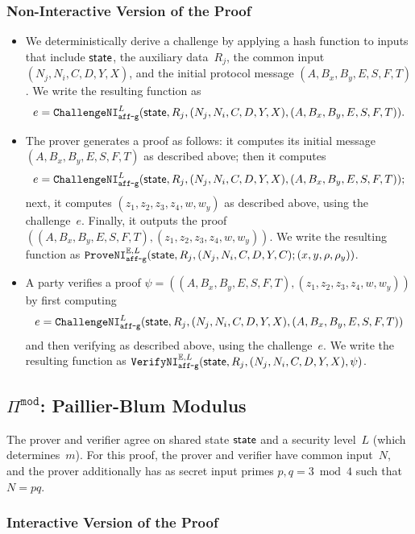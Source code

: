 \documentclass[11pt]{article}
\def\state{{\sf state}}
\newcommand{\proof}[1]{\ensuremath{\Pi^{\mathtt{#1}}}}
\newcommand{\challengeni}[1]{\ensuremath{\mathtt{ChallengeNI}_{\mathtt{#1}}}}
\newcommand{\proveni}[1]{\ensuremath{\mathtt{ProveNI}_{\mathtt{#1}}}}
\newcommand{\verifyni}[1]{\ensuremath{\mathtt{VerifyNI}_{\mathtt{#1}}}}
\newcommand{\E}{\mathbb{E}}
\newcommand{\?}[1]{\stackrel{?}{#1}}
\begin{document}
\subsubsection{Non-Interactive Version of the Proof}
\begin{itemize}
    \item We deterministically derive a challenge by applying a hash function to inputs that include $\state$, the auxiliary data~$R_j$, the common input~$(N_j,N_i,C,D,Y,X)$, and the initial protocol message $(A,B_x,B_y,E,S,F,T)$.    
We write the resulting function as \[e = \challengeni{aff\mbox{-}g}^{L}(\state,R_j,(N_j,N_i,C,D,Y,X),(A,B_x,B_y,E,S,F,T)).\]

    \item The prover generates a proof as follows: it computes its initial message $(A,B_x,B_y,E,S,F,T)$ as described above; then it computes \[e = \challengeni{aff\mbox{-}g}^{L}(\state,R_j,(N_j,N_i,C,D,Y,X),(A,B_x,B_y,E,S,F,T));\] next, it computes $(z_1,z_2,z_3,z_4,w,w_y)$ as described above, using the challenge~$e$. Finally, it outputs the proof $((A,B_x,B_y,E,S,F,T), (z_1,z_2,z_3,z_4,w,w_y))$. We write the resulting function as $\proveni{aff\mbox{-}g}^{\E,L}(\state, R_j, (N_j, N_i, C, D, Y, C); (x,y,\rho,\rho_y))$. 
  
    \item A party verifies a proof $\psi=((A,B_x,B_y,E,S,F,T), (z_1,z_2,z_3,z_4,w,w_y))$ by first computing 
    \[e = \challengeni{aff\mbox{-}g}^{L}(\state,R_j,(N_j,N_i,C,D,Y,X),(A,B_x,B_y,E,S,F,T))\]
    and then verifying as described above, using the challenge~$e$. We write the resulting function as $\verifyni{aff\mbox{-}g}^{\E,L}(\state,R_j, (N_j,N_i,C,D,Y,X), \psi)$.
\end{itemize}

\subsection{$\proof{mod}$: Paillier-Blum Modulus}
The prover and verifier agree on shared state $\state$ and a security level~$L$ (which determines~$m$). For this proof, the prover and verifier have common input~$N$, and the prover additionally has as secret input primes $p, q=3 \bmod 4$ such that~$N=pq$.

\subsubsection{Interactive Version of the Proof}
\end{document}
